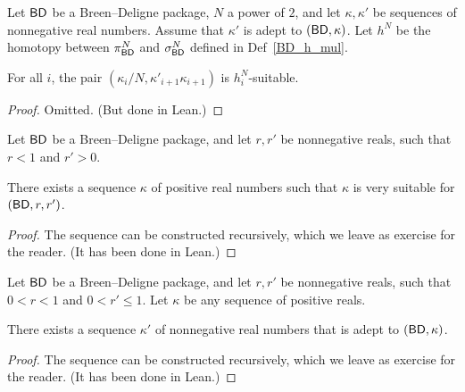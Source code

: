 \begin{lemma}
  \label{BD_h_mul_suitable}
  \leanok
  Let $\mathsf{BD}$ be a Breen--Deligne package, $N$ a power of $2$, and
  let $\kappa, \kappa'$ be sequences of nonnegative real numbers.
  Assume that $\kappa'$ is adept to $(\mathsf{BD}, \kappa)$.
  Let $h^N$ be the homotopy between $\pi^N_{\mathsf{BD}}$ and $\sigma^N_{\mathsf{BD}}$
  defined in Def~\ref{BD_h_mul}.

  For all $i$, the pair $(\kappa_i / N, \kappa'_{i+1} \kappa_{i+1})$
  is $h^N_i$-suitable.
\end{lemma}

\begin{proof}
  \leanok
  Omitted. (But done in Lean.)
\end{proof}

\begin{lemma}
  \label{exists_very_suitable}
  \leanok
  Let $\mathsf{BD}$ be a Breen--Deligne package, and
  let $r, r'$ be nonnegative reals, such that $r < 1$ and $r' > 0$.

  There exists a sequence $\kappa$ of positive real numbers
  such that $\kappa$ is very suitable for $(\mathsf{BD}, r, r')$.
\end{lemma}

\begin{proof}
  \leanok
  The sequence can be constructed recursively,
  which we leave as exercise for the reader.
  (It has been done in Lean.)
\end{proof}

\begin{lemma}
  \label{exists_adept}
  \leanok
  Let $\mathsf{BD}$ be a Breen--Deligne package, and
  let $r, r'$ be nonnegative reals, such that $0 < r < 1$ and $0 < r' \le 1$.
  Let $\kappa$ be any sequence of positive reals.

  There exists a sequence $\kappa'$ of nonnegative real numbers that is adept to $(\mathsf{BD}, \kappa)$.
\end{lemma}

\begin{proof}
  \leanok
  The sequence can be constructed recursively,
  which we leave as exercise for the reader.
  (It has been done in Lean.)
\end{proof}


